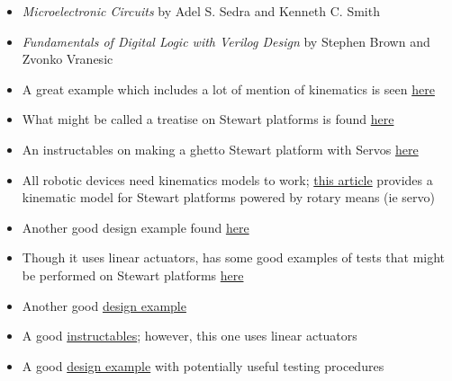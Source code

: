 \documentclass[a4paper, 10pt]{article}
\begin{document}
\begin{itemize}
				
		
		\item \textit{Microelectronic Circuits} by Adel S. Sedra and Kenneth C. Smith
		
		
		\item \textit{Fundamentals of Digital Logic with Verilog Design} by Stephen Brown and Zvonko Vranesic
		
		
		\item A great example which includes a lot of mention of kinematics is seen \href{https://ntrs.nasa.gov/api/citations/19910007810/downloads/19910007810.pdf}{here}
		\item What might be called a treatise on Stewart platforms is found \href{https://www.ri.cmu.edu/pub_files/pub4/fong_terrence_w_1990_1/fong_terrence_w_1990_1.pdf}{here}
		\item An instructables on making a ghetto Stewart platform with Servos \href{https://www.instructables.com/Stewart-Platform/}{here}
		\item All robotic devices need kinematics models to work; \href{https://www.xarg.org/paper/inverse-kinematics-of-a-stewart-platform/}{this article} provides a kinematic model for Stewart platforms powered by rotary means (ie servo)
		\item Another good design example found \href{https://iopscience.iop.org/article/10.1088/1757-899X/563/5/052059/pdf}{here}
		\item Though it uses linear actuators, has some good examples of tests that might be performed on Stewart platforms \href{https://www.ncbi.nlm.nih.gov/pmc/articles/PMC6513003/}{here}
		\item Another good \href{https://core.ac.uk/download/pdf/322824733.pdf}{design example}
		\item A good \href{https://www.instructables.com/Six-Axis-Platform-Using-Linear-Actuators-Stewart-P/}{instructables}; however, this one uses linear actuators
		\item A good \href{https://www.ohio.edu/mechanical-faculty/williams/html/PDF/IndRob02.pdf}{design example} with potentially useful testing procedures

\end{itemize}
\end{document}

